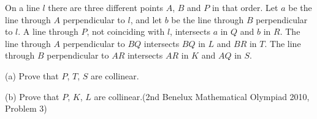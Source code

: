 On a line $l$ there are three different points $A$,  $B$ and $P$ in that order. Let $a$ be the line through $A$ perpendicular to $l$,  and let $b$ be the line through $B$ perpendicular to $l$. A line through $P$,  not coinciding with $l$,  intersects $a$ in $Q$ and $b$ in $R$. The line through $A$ perpendicular to $BQ$ intersects $BQ$ in $L$ and $BR$ in $T$. The line through $B$ perpendicular to $AR$ intersects $AR$ in $K$ and $AQ$ in $S$.

(a) Prove that $P$,  $T$,  $S$ are collinear.

(b) Prove that $P$,  $K$,  $L$ are collinear.(2nd Benelux Mathematical Olympiad 2010, Problem 3)